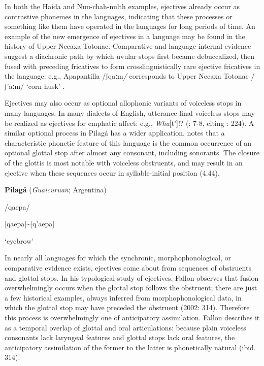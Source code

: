   In both the Haida and Nuu-chah-nulth examples, ejectives already occur as contrastive phonemes in the languages, indicating that these processes or something like them have operated in the languages for long periods of time. An example of the new emergence of ejectives in a language may be found in the history of Upper Necaxa Totonac. Comparative and language-internal evidence suggest a diachronic path by which uvular stops first became debuccalized, then fused with preceding fricatives to form crosslinguistically rare ejective fricatives in the language: e.g., Apapantilla /ʃqaːm\textit{/} corresponds to Upper Necaxa Totonac /ʃ’aːm/ ‘corn husk’ \citep[6]{Beck2006}.

  Ejectives may also occur as optional allophonic variants of voiceless stops in many languages. In many dialects of English, utterance-final voiceless stops may be realized as ejectives for emphatic affect: e.g., \textit{Wha}[t’]!? (\citealt{Fallon2002}: 7-8, citing \citealt{Taylor1995}: 224). A similar optional process in Pilagá has a wider application. \citet{Vidal2001} notes that a characteristic phonetic feature of this language is the common occurrence of an optional glottal stop after almost any consonant, including sonorants. The closure of the glottis is most notable with voiceless obstruents, and may result in an ejective when these sequences occur in syllable-initial position (4.44).

\ea\label{ex:(4.44)}
  \textbf{Pilagá} (\textit{Guaicuruan}; Argentina)

/qaepa/

[qaepa]{\textasciitilde}[q’aepa]

‘eyebrow’

\citep[36]{Vidal2001}

\z

  In nearly all languages for which the synchronic, morphophonological, or comparative evidence exists, ejectives come about from sequences of obstruents and glottal stops. In his typological study of ejectives, Fallon observes that fusion overwhelmingly occurs when the glottal stop follows the obstruent; there are just a few historical examples, always inferred from morphophonological data, in which the glottal stop may have preceded the obstruent (2002: 314). Therefore this process is overwhelmingly one of anticipatory assimilation. Fallon describes it as a temporal overlap of glottal and oral articulations: because plain voiceless consonants lack laryngeal features and glottal stops lack oral features, the anticipatory assimilation of the former to the latter is phonetically natural (ibid. 314).

